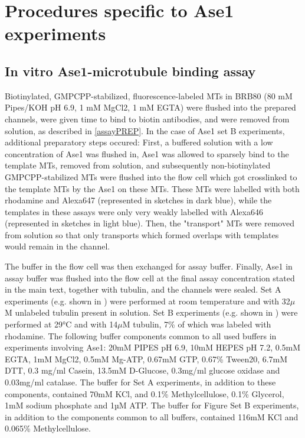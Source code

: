 \section{Procedures specific to Ase1 experiments}
\subsection{In vitro Ase1-microtubule binding assay}
Biotinylated, GMPCPP-stabilized, fluorescence-labeled MTs in BRB80 (80 mM Pipes/KOH pH 6.9, 1 mM MgCl2, 1 mM EGTA) were flushed into the prepared channels, were given time to bind to biotin antibodies, and were removed from solution, as described in \autoref{assayPREP}. In the case of Ase1 set B experiments, additional preparatory steps occured: First, a buffered solution with a low concentration of Ase1 was flushed in, Ase1 was allowed to sparsely bind to the template MTs, removed from solution, and subsequently non-biotinylated GMPCPP-stabilized MTs were flushed into the flow cell which got crosslinked to the template MTs by the Ase1 on these MTs. These MTs were labelled with both rhodamine and Alexa647 (represented in sketches in dark blue), while the templates in these assays were only very weakly labelled with Alexa646 (represented in sketches in light blue). Then, the "transport" MTs were removed from solution so that only transports which formed overlaps with templates would remain in the channel. \par 
The buffer in the flow cell was then exchanged for assay buffer. Finally, Ase1 in assay buffer was flushed into the flow cell at the final assay concentration stated in the main text, together with tubulin, and the channels were sealed. Set A experiments (e.g. shown in ) were performed at room temperature and with 32$\mu$M unlabeled tubulin present in solution. Set B experiments (e.g. shown in ) were performed at 29°C and with 14$\mu$M tubulin, 7\% of which was labeled with rhodamine. The following buffer components common to all used buffers in experiments involving Ase1: 20mM PIPES pH 6.9, 10mM HEPES pH 7.2, 0.5mM EGTA, 1mM MgCl2, 0.5mM Mg-ATP, 0.67mM GTP, 0.67\% Tween20, 6.7mM DTT, 0.3 mg/ml Casein, 13.5mM D-Glucose, 0.3mg/ml glucose oxidase and 0.03mg/ml catalase. The buffer for Set A experiments, in addition to these components, contained 70mM KCl, and 0.1\% Methylcellulose, 0.1\% Glycerol, 1mM sodium phosphate and 1µM ATP. The buffer for Figure Set B experiments, in addition to the components common to all buffers, contained 116mM KCl and 0.065\% Methylcellulose.

